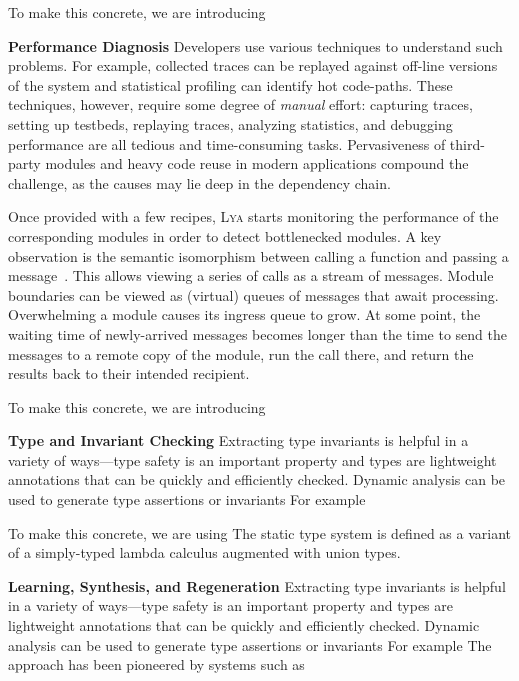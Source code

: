 \documentclass[letterpaper,twocolumn,10pt]{article}
\newcommand{\heading}[1]{\vspace{2pt}\noindent\textbf{#1}\enspace}
\newcommand{\sys}{{\scshape Lya}\xspace}
\begin{document}
To make this concrete, we are introducing

\heading{Performance Diagnosis}
Developers use various techniques to understand such problems.
For example, collected traces can be replayed against off-line versions of the system and statistical profiling can identify hot code-paths.
These techniques, however, require some degree of \emph{manual} effort:
  capturing traces, setting up testbeds, replaying traces, analyzing statistics, and debugging performance are all tedious and time-consuming tasks.
Pervasiveness of third-party modules and heavy code reuse in modern applications compound the challenge, as the causes may lie deep in the dependency chain.

Once provided with a few recipes, \sys starts monitoring the performance of the corresponding modules in order to detect bottlenecked modules.
A key observation is the semantic isomorphism between calling a function and passing a message~\cite{scheme:98, duality:79}.
This allows viewing a series of calls as a stream of messages. %
Module boundaries can be viewed as (virtual) queues of messages that await processing.
Overwhelming a module causes its ingress queue to grow.
At some point, the waiting time of newly-arrived messages becomes longer than the time to send the messages to a remote copy of the module, run the call there, and return the results back to their intended recipient.

To make this concrete, we are introducing

\heading{Type and Invariant Checking}
Extracting type invariants is helpful in a variety of ways---type safety is an important property and types are lightweight annotations that can be quickly and efficiently checked.
Dynamic analysis can be used to generate type assertions or invariants
For example

To make this concrete, we are using
The static type system is defined as a variant of a simply-typed lambda calculus augmented with union types.

\heading{Learning, Synthesis, and Regeneration}
Extracting type invariants is helpful in a variety of ways---type safety is an important property and types are lightweight annotations that can be quickly and efficiently checked.
Dynamic analysis can be used to generate type assertions or invariants
For example
The approach has been pioneered by systems such as 
\end{document}
